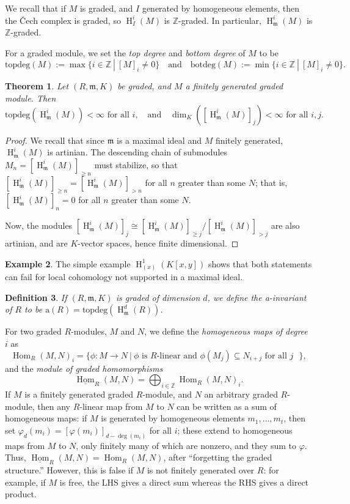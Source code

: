 \documentclass[11pt]{book}
\newtheorem{theorem}{Theorem}[chapter]
\newtheorem{definition}[theorem]{Definition}
\numberwithin{equation}{section}
\numberwithin{theorem}{chapter}
\theoremstyle{definition}
\newtheorem{example}[theorem]{Example}
\newtheorem*{basic properties}{Basic Properties}
\newtheorem*{Important Remark}{Important Remark}
\theoremstyle{remark}
\newcommand{\ZZ}{\mathbb{Z}}
\newcommand{\m}{\mathfrak{m}}
\newcommand{\Hom}{\operatorname{Hom}}
\renewcommand{\dim}{\operatorname{dim}}
\newcommand{\tp}{\mathrm{topdeg}}
\newcommand{\bt}{\mathrm{botdeg}}
\newcommand{\ai}{\mathrm{a}}
\newcommand{\grHom}{\underline{\operatorname{Hom}}}
\renewcommand{\H}{\operatorname{H}}
\begin{document}
We recall that if $M$ is graded, and $I$ generated by homogeneous elements, then the \v Cech complex is graded, so $\H^i_I(M)$ is $\ZZ$-graded. In particular, $\H^i_{\m}(M)$ is $\ZZ$-graded. 

For a graded module, we set the \emph{top degree}\index{$\tp(M)$} and \emph{bottom degree}\index{$\bt(M)$} of $M$ to be 
\[\tp(M):=\max\{ i \in \ZZ \ | \ [M]_i\neq 0\} \quad \text{and} \quad \bt(M):=\min\{ i \in \ZZ \ | \ [M]_i\neq 0\}.\]

\begin{theorem} Let $(R,\m,K)$ be graded, and $M$ a finitely generated graded module. Then 
\[\tp(\H^i_\m(M))<\infty \text{ for all } i, \quad \text{and} \quad \dim_K([\H^i_\m(M)]_j)<\infty \text{ for all }i,j.\]
\end{theorem}
\begin{proof}
We recall that since $\m$ is a maximal ideal and $M$ finitely generated, $\H^i_{\m}(M)$ is artinian.
The descending chain of submodules $M_n=[\H^i_{\m}(M)]_{\geq n}$ must stabilize, so that $[\H^i_{\m}(M)]_{\geq n}=[\H^i_{\m}(M)]_{>n}$ for all $n$ greater than some $N$; that is, $[\H^i_{\m}(M)]_n=0$ for all $n$ greater than some $N$.

Now, the modules $[\H^i_\m(M)]_j\cong [\H^i_\m(M)]_{\geq j}/[\H^i_\m(M)]_{>j}$ are also artinian, and are $K$-vector spaces, hence finite dimensional.
\end{proof}

\begin{example}
The simple example $\H^1_{(x)}(K[x,y])$ shows that both statements can fail for local cohomology not supported in a maximal ideal.
\end{example}

\begin{definition}
If $(R,\m,K)$ is graded of dimension $d$, we define the \emph{a-invariant}\index{$\ai(R)$} of $R$ to be $\ai(R)=\tp(\H^d_{\m}(R))$.
\end{definition}

For two graded $R$-modules, $M$ and $N$, we define the \emph{homogeneous maps of degree $i$}\index{$\Hom_R(M,N)_i$} as
\[\Hom_R(M,N)_i=\{ \phi:M\to N \ | \ \phi \text{ is $R$-linear and } \phi(M_j)\subseteq N_{i+j} \text{ for all $j$ }\},\]
and the \emph{module of graded homomorphisms}\index{$\grHom_R(M,N)$}
\[ \grHom_R(M,N)=\bigoplus_{i\in \ZZ} \Hom_R(M,N)_i .\]
If $M$ is a finitely generated graded $R$-module, and $N$ an arbitrary graded $R$-module, then any $R$-linear map from $M$ to $N$ can be written as a sum of homogeneous maps: if $M$ is generated by homogeneous elements $m_1,\dots,m_t$, then set $\varphi_d(m_i)=[\varphi(m_i)]_{d-\deg(m_i)}$ for all $i$; these extend to homogeneous maps from $M$ to $N$, only finitely many of which are nonzero, and they sum to $\varphi$. Thus, $\grHom_R(M,N)=\Hom_R(M,N)$, after ``forgetting the graded structure.'' However, this is false if $M$ is not finitely generated over $R$: for example, if $M$ is free, the LHS gives a direct sum whereas the RHS gives a direct product.
\end{document}
